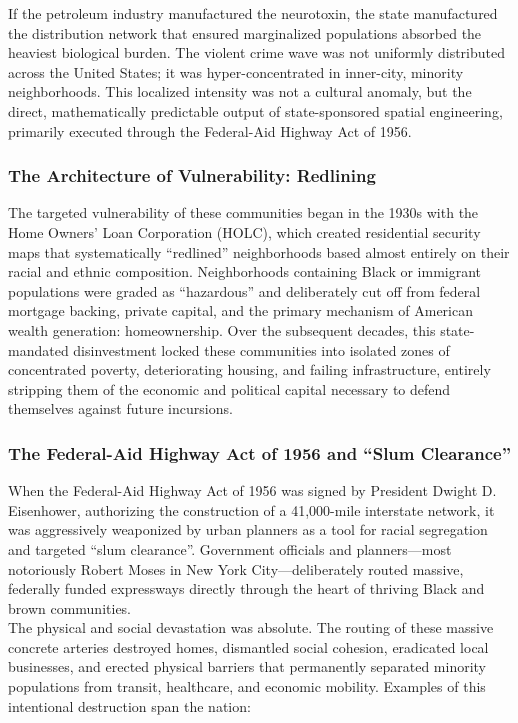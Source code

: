 \documentclass[
]{article}
\begin{document}
If the petroleum industry manufactured the neurotoxin, the state
manufactured the distribution network that ensured marginalized
populations absorbed the heaviest biological burden. The violent crime
wave was not uniformly distributed across the United States; it was
hyper-concentrated in inner-city, minority neighborhoods. This localized
intensity was not a cultural anomaly, but the direct, mathematically
predictable output of state-sponsored spatial engineering, primarily
executed through the Federal-Aid Highway Act of 1956.

\subsubsection{\texorpdfstring{\textbf{The Architecture of
Vulnerability:
Redlining}}{The Architecture of Vulnerability: Redlining}}\label{the-architecture-of-vulnerability-redlining}

The targeted vulnerability of these communities began in the 1930s with
the Home Owners' Loan Corporation (HOLC), which created residential
security maps that systematically ``redlined'' neighborhoods based
almost entirely on their racial and ethnic composition. Neighborhoods
containing Black or immigrant populations were graded as ``hazardous''
and deliberately cut off from federal mortgage backing, private capital,
and the primary mechanism of American wealth generation: homeownership.
Over the subsequent decades, this state-mandated disinvestment locked
these communities into isolated zones of concentrated poverty,
deteriorating housing, and failing infrastructure, entirely stripping
them of the economic and political capital necessary to defend
themselves against future incursions.

\subsubsection{\texorpdfstring{\textbf{The Federal-Aid Highway Act of
1956 and ``Slum
Clearance''}}{The Federal-Aid Highway Act of 1956 and ``Slum Clearance''}}\label{the-federal-aid-highway-act-of-1956-and-slum-clearance}

When the Federal-Aid Highway Act of 1956 was signed by President Dwight
D. Eisenhower, authorizing the construction of a 41,000-mile interstate
network, it was aggressively weaponized by urban planners as a tool for
racial segregation and targeted ``slum clearance''. Government officials
and planners---most notoriously Robert Moses in New York
City---deliberately routed massive, federally funded expressways
directly through the heart of thriving Black and brown communities.\\
The physical and social devastation was absolute. The routing of these
massive concrete arteries destroyed homes, dismantled social cohesion,
eradicated local businesses, and erected physical barriers that
permanently separated minority populations from transit, healthcare, and
economic mobility. Examples of this intentional destruction span the nation:
\end{document}
